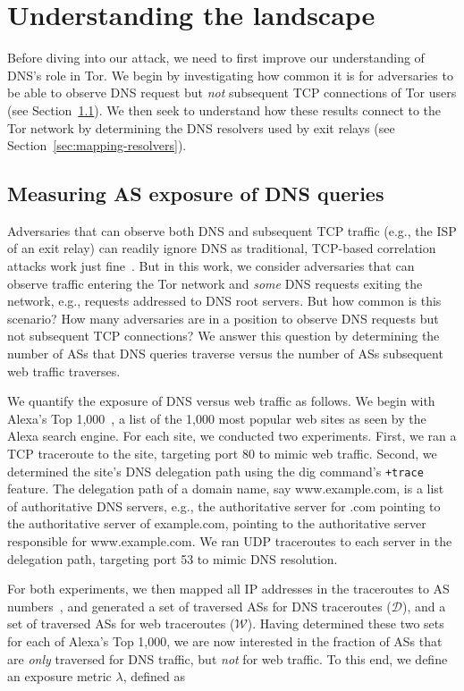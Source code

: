 \section{Understanding the landscape}
\label{sec:landscape}
Before diving into our attack, we need to first improve our understanding of
DNS's role in Tor.  We begin by investigating how common it is for adversaries
to be able to observe DNS request but \emph{not} subsequent TCP connections of
Tor users (see Section~\ref{sec:as-exposure}).  We then seek to understand how
these results connect to the Tor network by determining the DNS resolvers used
by exit relays (see Section~\ref{sec:mapping-resolvers}).

\subsection{Measuring AS exposure of DNS queries}
\label{sec:as-exposure}
Adversaries that can observe both DNS and subsequent TCP traffic (e.g., the ISP
of an exit relay) can readily ignore DNS as traditional, TCP-based correlation
attacks work just fine~\cite{Murdoch2007a}.  But in this work, we consider
adversaries that can observe traffic entering the Tor network and \emph{some}
DNS requests exiting the network, e.g., requests addressed to DNS root servers.
But how common is this scenario?  How many adversaries are in a position to
observe DNS requests but not subsequent TCP connections?  We answer this
question by determining the number of ASs that DNS queries traverse versus the
number of ASs subsequent web traffic traverses.

We quantify the exposure of DNS versus web traffic as follows.  We begin with
Alexa's Top 1,000~\cite{alexatop1k}, a list of the 1,000 most popular web sites
as seen by the Alexa search engine.  For each site, we conducted two
experiments.  First, we ran a TCP traceroute to the site, targeting port 80 to
mimic web traffic.  Second, we determined the site's DNS delegation path using
the dig command's \texttt{+trace} feature.  The delegation path of a domain
name, say www.example.com, is a list of authoritative DNS servers, e.g., the
authoritative server for .com pointing to the authoritative server of
example.com, pointing to the authoritative server responsible for
www.example.com.  We ran UDP traceroutes to each server in the delegation path,
targeting port 53 to mimic DNS resolution.

For both experiments, we then mapped all IP addresses in the traceroutes to AS
numbers~\cite{ipasn}, and generated a set of traversed ASs for DNS traceroutes
($\mathcal{D}$), and a set of traversed ASs for web traceroutes
($\mathcal{W}$).  Having determined these two sets for each of Alexa's Top
1,000, we are now interested in the fraction of ASs that are \emph{only}
traversed for DNS traffic, but \emph{not} for web traffic.  To this end, we
define an exposure metric $\lambda$, defined as

